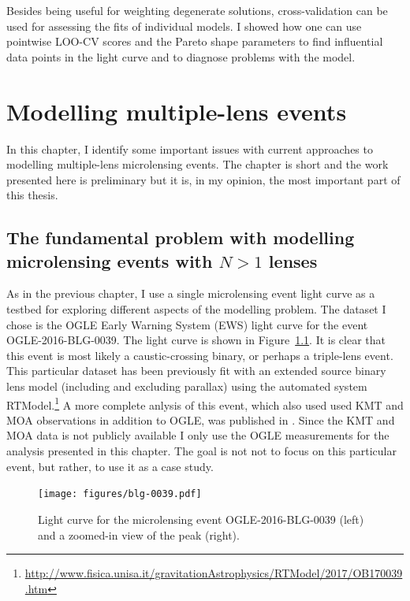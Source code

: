 \documentclass[12pt,dvipsnames]{report}
\begin{document}
Besides being useful for weighting degenerate solutions, cross-validation can be 
used for assessing the fits of individual models. I showed how one can use pointwise 
LOO-CV scores and the Pareto shape parameters to find influential data points in the 
light curve and to diagnose problems with the model.


\chapter{Modelling multiple-lens events}
\label{ch:multiple_lens_models}
In this chapter, I identify some important issues with current approaches to modelling 
multiple-lens microlensing events. The chapter is short and the work presented here 
is preliminary but it is, in my opinion, the most important part of this thesis.

\section{The fundamental problem with modelling microlensing events with $N>1$ lenses}
As in the previous chapter, I use a single microlensing event light curve
as a testbed for exploring different aspects of the modelling problem. 
The dataset I chose is the OGLE Early Warning System (EWS) light curve for the event
OGLE-2016-BLG-0039. The light curve is shown in Figure~\ref{fig:blg-0039}. 
It is clear that this event is most likely a caustic-crossing binary, or perhaps a 
triple-lens event. 
This particular dataset has been previously fit with 
an extended source binary lens model (including and excluding parallax) using the automated system 
RTModel.\footnote{\url{http://www.fisica.unisa.it/gravitationAstrophysics/RTModel/2017/OB170039.htm}}
A more complete anlysis of this event, which also used   used KMT and MOA observations in addition to OGLE,
was published in \citet{2018ApJ...867..136H}. 
Since the KMT and MOA data is not publicly available I only use the OGLE measurements for 
the analysis presented in this chapter. 
The goal is not not to focus on this particular event, but rather, to use it as a case study.

\begin{figure}[!t]
    \begin{centering}
        \texttt{[image: figures/blg-0039.pdf]}
        \caption{
            Light curve for the microlensing event OGLE-2016-BLG-0039 (left) and a 
            zoomed-in view of the peak (right). 
        }
            \label{fig:blg-0039}
    \end{centering}
\end{figure}
\end{document}
